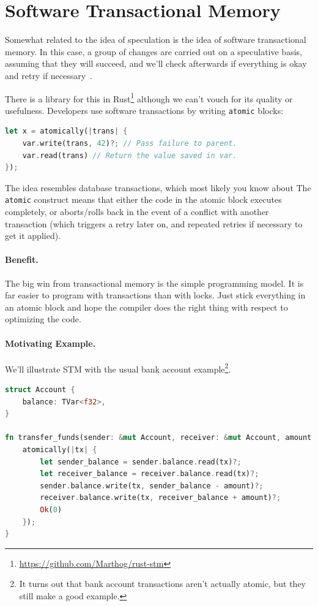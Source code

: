 \documentclass[a4paper]{report}
\begin{document}
\section*{Software Transactional Memory}
Somewhat related to the idea of speculation is the idea of software transactional memory. In this case, a group of changes are carried out on a speculative basis, assuming that they will succeed, and we'll check afterwards if everything is okay and retry if necessary~\cite{stm}. 

There is a library for this in Rust\footnote{\url{https://github.com/Marthog/rust-stm}} although we can't vouch for its quality or usefulness. Developers use software transactions by writing {\tt atomic} blocks:
\begin{lstlisting}[language=Rust]
let x = atomically(|trans| {
    var.write(trans, 42)?; // Pass failure to parent.
    var.read(trans) // Return the value saved in var.
});
\end{lstlisting}
The idea resembles database transactions, which most likely you know about
The {\tt atomic} construct means that either the code in
the atomic block executes completely, or aborts/rolls back in the
event of a conflict with another transaction (which triggers a retry
later on, and repeated retries if necessary to get it applied).

\paragraph{Benefit.} The big win from transactional memory is the simple
programming model. It is far easier to program with transactions than with
locks. Just stick everything in an atomic block and hope the compiler does the
right thing with respect to optimizing the code.

\paragraph{Motivating Example.} We'll illustrate STM with the usual bank account example\footnote{It turns out that bank account transactions aren't actually atomic, but they still make a good example.}.
\begin{lstlisting}[language=Rust]
struct Account {
    balance: TVar<f32>,
}

fn transfer_funds(sender: &mut Account, receiver: &mut Account, amount: f32) {
    atomically(|tx| {
        let sender_balance = sender.balance.read(tx)?;
        let receiver_balance = receiver.balance.read(tx)?;
        sender.balance.write(tx, sender_balance - amount)?;
        receiver.balance.write(tx, receiver_balance + amount)?;
        Ok(0)
    });
}
\end{lstlisting}
\end{document}
